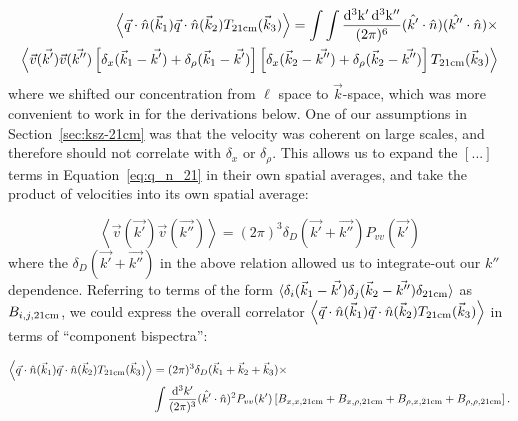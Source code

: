 \begin{equation}
\begin{split}
\left\langle \vec{q} \cdot \hat{n}(\vec{k}_1) \vec{q} \cdot \hat{n} (\vec{k}_2) T_{\rm 21cm}(\vec{k}_3) \right\rangle =
\int \int \frac{ {\rm d^3k' \, d^3k''} }{(2\pi)^6} (\hat{k'}\cdot\hat{n}) (\hat{k''}\cdot\hat{n}) \times \\
\left\langle 
\vec{v}(\vec{k'})\vec{v}(\vec{k''}) 
\left[ \delta_x(\vec{k}_1 - \vec{k'}) + \delta_{\rho}(\vec{k}_1 - \vec{k'})\right]
\left[ \delta_x(\vec{k}_2 - \vec{k''}) + \delta_{\rho}(\vec{k}_2 - \vec{k''})\right] 
T_{\rm 21cm}(\vec{k}_3)
\right\rangle
\end{split}
\label{eq:q_n_21}
\end{equation}
where we shifted our concentration from $\ell$ space to $\vec{k}$-space, which was more convenient to work in for the derivations below.
One of our assumptions in Section~\ref{sec:ksz-21cm} was that the velocity was coherent on large scales, and therefore should not correlate with $\delta_{x}$ or $\delta_{\rho}$. This allows us to expand the $[...]$ terms in Equation~\ref{eq:q_n_21} in their own spatial averages, and take the product of velocities into its own spatial average:

\begin{equation}
\left\langle \vec{v}(\vec{k'})\vec{v}(\vec{k''}) \right\rangle = (2\pi)^3 \delta_D(\vec{k'} + \vec{k''})P_{vv}(\vec{k'})
\label{eq:Pvv}
\end{equation}
where the $\delta_D(\vec{k'} + \vec{k''})$ in the above relation allowed us to integrate-out our $k''$ dependence. Referring to terms of the form $\langle \delta_i(\vec{k}_1 - \vec{k'}) \delta_j(\vec{k}_2 - \vec{k''}) \delta_{\rm 21cm}\rangle$ as $B_{i,j,{\rm 21cm}}$, we could express the overall correlator $\left\langle \vec{q} \cdot \hat{n}(\vec{k}_1) \vec{q} \cdot \hat{n} (\vec{k}_2) T_{\rm 21cm}(\vec{k}_3) \right\rangle$ in terms of ``component bispectra'':

\begin{equation}
\begin{split}
\left\langle \vec{q} \cdot \hat{n}(\vec{k}_1) \vec{q} \cdot \hat{n} (\vec{k}_2) T_{\rm 21cm}(\vec{k}_3) \right\rangle &= 
(2\pi)^3 \delta_D(\vec{k}_1 + \vec{k}_2 + \vec{k}_3) \times \\
& \int \frac{{\rm d^3}k'}{(2\pi)^3} (\hat{k'}\cdot\hat{n})^2 P_{vv}(k') 
\left[ B_{x,x,\rm 21cm} + B_{x,\rho,\rm 21cm} + B_{\rho,x,\rm 21cm} +B_{\rho,\rho,\rm 21cm} \right].
\end{split}
\end{equation}

